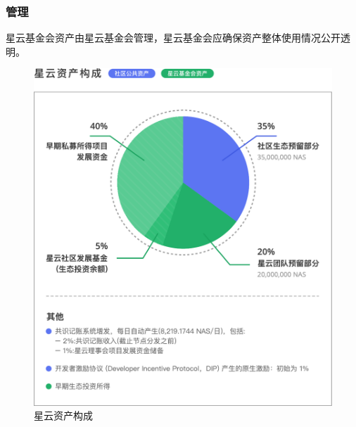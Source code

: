 \subsubsection{管理}

星云基金会资产由星云基金会管理，星云基金会应确保资产整体使用情况公开透明。

\begin{figure}
	\centering
	\includegraphics[width=1\textwidth]{../common/ch/assets.pdf}
	\caption{星云资产构成 \label{fig:assets}}
\end{figure}